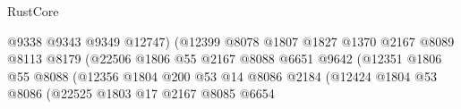 \begin{lexlean}{RustCore}
\begin{coremodule}
                                                      @9338
                                                      @9343
                                                      @9349
                                                      @12747)
                                                    (@12399
                                                      @8078
                                                      @1807
                                                      @1827
                                                      @1370
                                                      @2167
                                                      @8089
                                                      @8113
                                                      @8179
                                                      (@22506
                                                        @1806
                                                        @55
                                                        @2167
                                                        @8088
                                                        @6651
                                                        @9642
                                                        (@12351
                                                          @1806
                                                          @55
                                                          @8088
                                                          (@12356
                                                            @1804
                                                            @200
                                                            @53
                                                            @14
                                                            @8086
                                                            @2184
                                                            (@12424
                                                              @1804
                                                              @53
                                                              @8086
                                                              (@22525
                                                                @1803
                                                                @17
                                                                @2167
                                                                @8085
                                                                @6654

\end{coremodule}
\end{lexlean}
